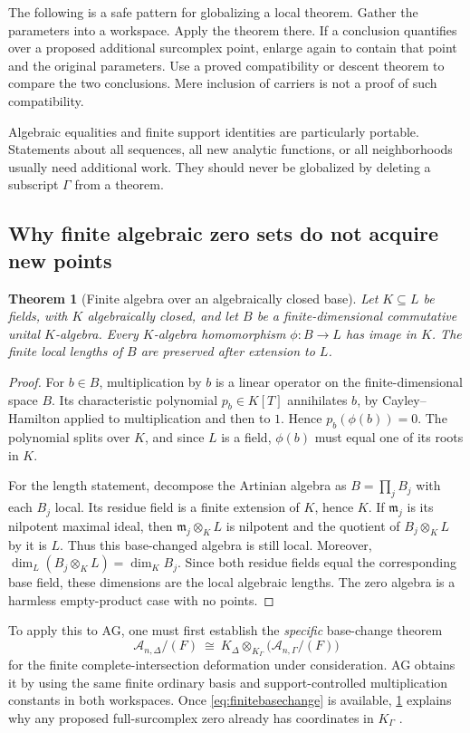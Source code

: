 \documentclass[11pt,letterpaper]{article}
\newtheorem{theorem}{Theorem}[section]
\theoremstyle{definition}
\theoremstyle{remark}
\newcommand{\A}{\mathscr A}
\newcommand{\m}{\mathfrak m}
\numberwithin{equation}{section}
\begin{document}
The following is a safe pattern for globalizing a local theorem. Gather the parameters into a workspace. Apply the theorem there. If a conclusion quantifies over a proposed additional surcomplex point, enlarge again to contain that point and the original parameters. Use a proved compatibility or descent theorem to compare the two conclusions. Mere inclusion of carriers is not a proof of such compatibility.

Algebraic equalities and finite support identities are particularly portable. Statements about all sequences, all new analytic functions, or all neighborhoods usually need additional work. They should never be globalized by deleting a subscript \(\Gamma\) from a theorem.

\subsection{Why finite algebraic zero sets do not acquire new points}
\begin{theorem}[Finite algebra over an algebraically closed base]\label{thm:finitepoints}
Let \(K\subseteq L\) be fields, with \(K\) algebraically closed, and let \(B\) be a finite-dimensional commutative unital \(K\)-algebra. Every \(K\)-algebra homomorphism \(\phi:B\to L\) has image in \(K\). The finite local lengths of \(B\) are preserved after extension to \(L\).
\end{theorem}
\begin{proof}
For \(b\in B\), multiplication by \(b\) is a linear operator on the finite-dimensional space \(B\). Its characteristic polynomial \(p_b\in K[T]\) annihilates \(b\), by Cayley--Hamilton applied to multiplication and then to \(1\). Hence \(p_b(\phi(b))=0\). The polynomial splits over \(K\), and since \(L\) is a field, \(\phi(b)\) must equal one of its roots in \(K\).

For the length statement, decompose the Artinian algebra as \(B=\prod_j B_j\) with each \(B_j\) local. Its residue field is a finite extension of \(K\), hence \(K\). If \(\m_j\) is its nilpotent maximal ideal, then \(\m_j\otimes_K L\) is nilpotent and the quotient of \(B_j\otimes_K L\) by it is \(L\). Thus this base-changed algebra is still local. Moreover,
\(\dim_L(B_j\otimes_K L)=\dim_K B_j\). Since both residue fields equal the corresponding base field, these dimensions are the local algebraic lengths. The zero algebra is a harmless empty-product case with no points.
\end{proof}

To apply this to AG, one must first establish the \emph{specific} base-change theorem
\begin{equation}\label{eq:finitebasechange}
 \A_{n,\Delta}/(F)\ \cong\
 K_\Delta\otimes_{K_\Gamma}\bigl(\A_{n,\Gamma}/(F)\bigr)
\end{equation}
for the finite complete-intersection deformation under consideration. AG obtains it by using the same finite ordinary basis and support-controlled multiplication constants in both workspaces. Once \eqref{eq:finitebasechange} is available, \cref{thm:finitepoints} explains why any proposed full-surcomplex zero already has coordinates in \(K_\Gamma\) \cite[\S10]{AG}.
\end{document}
